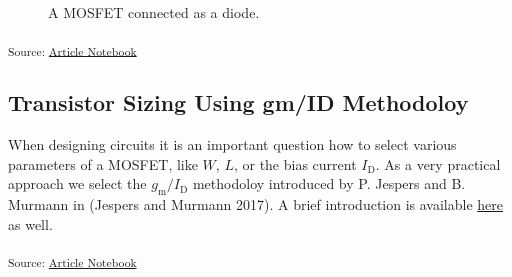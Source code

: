 \documentclass[
  a4paper,
  DIV=11,
  numbers=noendperiod]{scrartcl}
\begin{document}
\begin{figure}[H]


\caption{\label{fig-mosfet-diode}A MOSFET connected as a diode.}

\end{figure}%

\textsubscript{Source:
\href{https://iic-jku.github.io/analog-circuit-design/index.qmd.html}{Article
Notebook}}

\subsection{Transistor Sizing Using gm/ID
Methodoloy}\label{transistor-sizing-using-gmid-methodoloy}

When designing circuits it is an important question how to select
various parameters of a MOSFET, like \(W\), \(L\), or the bias current
\(I_\mathrm{D}\). As a very practical approach we select the
\(g_\mathrm{m}/I_\mathrm{D}\) methodoloy introduced by P. Jespers and B.
Murmann in (Jespers and Murmann 2017). A brief introduction is available
\href{https://github.com/iic-jku/analog-circuit-design/blob/main/sizing/Ref_Murmann_gmID.pdf}{here}
as well.

\textsubscript{Source:
\href{https://iic-jku.github.io/analog-circuit-design/index.qmd.html}{Article
Notebook}}
\end{document}
